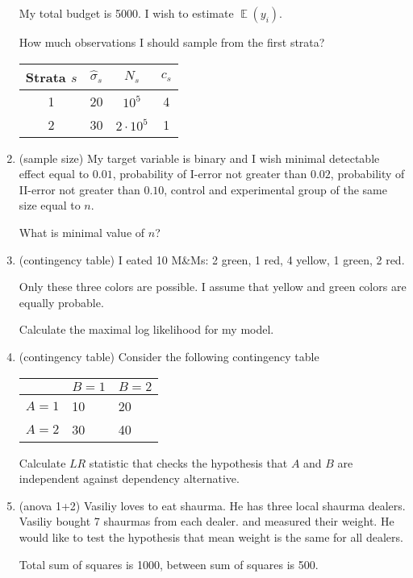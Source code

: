 \documentclass[12pt]{article}
\DeclareMathOperator{\E}{\mathbb{E}}
\begin{document}
\begin{enumerate}
    My total budget is 5000. I wish to estimate $\E(y_i)$. 
    
    How much observations I should sample from the first strata?

    \begin{tabular}{cccc}
        \toprule
        Strata $s$ & $\hat\sigma_s$ & $N_s$ & $c_s$ \\
        \midrule
        1 & 20 & $10^5$ & 4 \\
        2 & 30 & $2\cdot 10^5$ & 1\\
        \bottomrule
    \end{tabular}
    
    
    \item (sample size) My target variable is binary and I wish 
    minimal detectable effect equal to $0.01$, probability of I-error  not greater than $0.02$, 
    probability of II-error not greater than $0.10$, control and experimental group of the same size equal to $n$.

    What is minimal value of $n$?

    \item (contingency table) I eated 10 M\&Ms: 2 green, 1 red, 4 yellow, 1 green, 2 red.  
    
    Only these three colors are possible. I assume that yellow and green colors are equally probable.  
    
    Calculate the maximal log likelihood for my model.  
    \item (contingency table) Consider the following contingency table 
    
    \begin{tabular}{@{}lll@{}}
        \toprule
         & $B=1$ & $B=2$ \\ 
         \midrule
         $A=1$ & 10 & 20 \\
         $A=2$ & 30 & 40 \\
        \bottomrule
        \end{tabular}


    Calculate $LR$ statistic that checks the hypothesis that $A$ and $B$ are independent against dependency alternative. 

    \item (anova 1+2) Vasiliy loves to eat shaurma. He has three local shaurma dealers. Vasiliy bought 7 shaurmas from each dealer. 
    and measured their weight. He would like to test the hypothesis that mean weight is the same for all dealers. 

    Total sum of squares is 1000, between sum of squares is 500. 


\end{enumerate}
\end{document}
